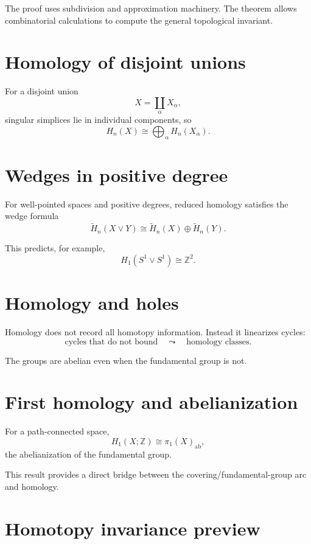 The proof uses subdivision and approximation machinery.  The theorem allows
combinatorial calculations to compute the general topological invariant.

\section{Homology of disjoint unions}

For a disjoint union
\[
X=\coprod_\alpha X_\alpha,
\]
singular simplices lie in individual components, so
\[
H_n(X)
\cong
\bigoplus_\alpha H_n(X_\alpha).
\]

\section{Wedges in positive degree}

For well-pointed spaces and positive degrees, reduced homology satisfies the
wedge formula
\[
\widetilde H_n(X\vee Y)
\cong
\widetilde H_n(X)\oplus\widetilde H_n(Y).
\]

This predicts, for example,
\[
H_1(S^1\vee S^1)\cong\mathbb Z^2.
\]

\section{Homology and holes}

Homology does not record all homotopy information.  Instead it linearizes
cycles:
\[
\text{cycles that do not bound}
\quad\leadsto\quad
\text{homology classes}.
\]

The groups are abelian even when the fundamental group is not.

\section{First homology and abelianization}

\begin{theorem}
\label{thm:viii17-h1-abelianization}
For a path-connected space,
\[
H_1(X;\mathbb Z)
\cong
\pi_1(X)_{\mathrm{ab}},
\]
the abelianization of the fundamental group.
\end{theorem}

This result provides a direct bridge between the covering/fundamental-group arc
and homology.

\section{Homotopy invariance preview}

